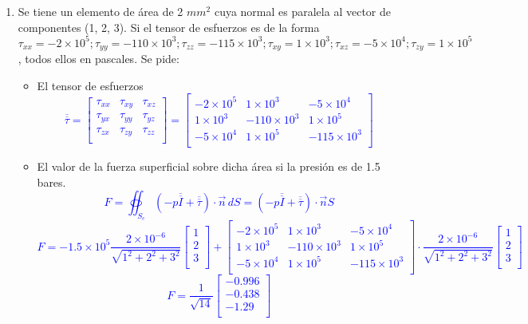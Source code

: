 \begin{enumerate}
	
	
	
	
	\item Se tiene un elemento de área de 2 $mm^2$ cuya normal es paralela al vector de componentes
	(1, 2, 3). Si el tensor de esfuerzos es de la forma $\tau_{xx} = -2 \times 10^5; \tau_{yy} = -110 \times 10^ 3; \tau_{zz} =
	-115 \times 10^3; \tau_{xy} = 1\times10^3; \tau_{xz} = -5 \times 10^4;  \tau_{zy} = 1 \times 10^5$, todos ellos en pascales. Se pide:
	\begin{itemize}
		\item 	El tensor de esfuerzos
		\textcolor{blue}{
		\[\overline{\overline{\tau}}=\begin{bmatrix}
			\tau_{xx} &\tau_{xy}&\tau_{xz}\\
				\tau_{yx} &\tau_{yy}&\tau_{yz}\\
					\tau_{zx} &\tau_{zy}&\tau_{zz}\\
		\end{bmatrix}=
		\begin{bmatrix}
		 -2 \times 10^5&1\times10^3&-5 \times 10^4\\
		1\times10^3& -110 \times 10^ 3&1 \times 10^5\\
		 -5 \times 10^4&1 \times 10^5&-115 \times 10^3\\
		\end{bmatrix}
		\]}
		\item El valor de la fuerza superficial sobre dicha área  si la presión es de 1.5 bares.
			\textcolor{blue}{\[F=\oiint_{S_c}\left(-p\overline{\overline{I}}+\overline{\overline{\tau}}\right)\cdot\vec{n}\,dS=\left(-p\overline{\overline{I}}+\overline{\overline{\tau}}\right)\cdot\vec{n}S \]
			\[	F=-1.5\times10^5 \frac{2\times 10^{-6}}{\sqrt{1^2+2^2+3^2}}\begin{bmatrix}
					1 \\
					2 \\
					3 \\
				\end{bmatrix}+	\begin{bmatrix}
				-2 \times 10^5&1\times10^3&-5 \times 10^4\\
				1\times10^3& -110 \times 10^ 3&1 \times 10^5\\
				-5 \times 10^4&1 \times 10^5&-115 \times 10^3\\
				\end{bmatrix}\cdot\frac{2\times 10^{-6}}{\sqrt{1^2+2^2+3^2}}\begin{bmatrix}
				1 \\
				2 \\
				3 \\
				\end{bmatrix}\]
			\[F=\frac{1}{\sqrt{14}}\begin{bmatrix}
				-0.996 \\
				-0.438 \\
				-1.29 \\
			\end{bmatrix}\]}
	\end{itemize}
\newpage
	


\end{enumerate}
